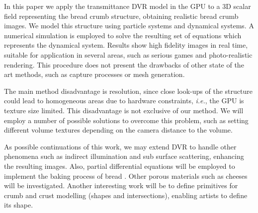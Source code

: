 \documentclass[oneside,a4paper,english,links]{amca}
\begin{document}
In this paper we apply the transmittance DVR model in the GPU to a 3D scalar field representing the bread crumb structure, obtaining realistic bread crumb images. We model this structure using particle systems and dynamical systems. A numerical simulation is employed to solve the resulting set of equations which represents the dynamical system. Results show high fidelity images in real time, suitable for application in several areas, such as serious games \citep{Susi2007} and photo-realistic rendering. This procedure does not present the drawbacks of other state of the art methods, such as capture processes or mesh generation.

The main method disadvantage is resolution, since close look-ups of the structure could lead to homogeneous areas due to hardware constraints, {\em i.e.}, the GPU is texture size limited. This disadvantage is not exclusive of our method. We will employ a number of possible solutions to overcome this problem, such as setting different volume textures depending on the camera distance to the volume. 

As possible continuations of this work, we may extend DVR to handle other phenomena such as indirect illumination and sub surface scattering, enhancing the resulting images. Also, partial differential equations will be employed to implement the baking process of bread \citep{Purlis2012}. Other porous materials such as cheeses will be investigated. Another interesting work will be to define primitives for crumb and crust modelling (shapes and intersections), enabling artists to define its shape.

%

\end{document}
